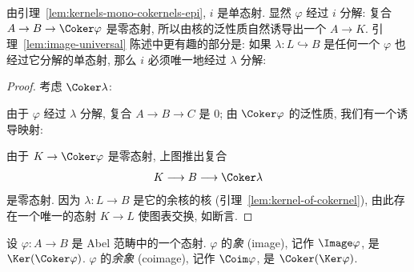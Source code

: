 \indent 由引理~\ref{lem:kernels-mono-cokernels-epi}, $i$ 是单态射. 显然 $\varphi$ 经过 $i$ 分解: 复合 $A\to B\to\Coker\varphi$ 是零态射, 所以由核的泛性质自然诱导出一个 $A\to K$. 引理~\ref{lem:image-universal} 陈述中更有趣的部分是: 如果 $\lambda:L\hookrightarrow B$ 是任何一个 $\varphi$ 也经过它分解的单态射, 那么 $i$ 必须唯一地经过 $\lambda$ 分解:
\begin{center}
\end{center}

\begin{proof}
考虑 $\Coker\lambda$:
\begin{center}
\end{center}
由于 $\varphi$ 经过 $\lambda$ 分解, 复合 $A\to B\to C$ 是 $0$; 由 $\Coker\varphi$ 的泛性质, 我们有一个诱导映射:
\begin{center}
\end{center}
由于 $K\to\Coker\varphi$ 是零态射, 上图推出复合
\[
K\longrightarrow B\longrightarrow\Coker\lambda
\]
是零态射. 因为 $\lambda:L\to B$ 是它的余核的核 (引理~\ref{lem:kernel-of-cokernel}), 由此存在一个唯一的态射 $K\to L$ 使图表交换, 如断言.
\end{proof}

\begin{definition}\label{def:image-coimage}
设 $\varphi:A\to B$ 是 Abel 范畴中的一个态射. $\varphi$ 的\emph{象} (image), 记作 $\Image\varphi$, 是 $\Ker(\Coker\varphi)$. $\varphi$ 的\emph{余象} (coimage), 记作 $\Coim\varphi$, 是 $\Coker(\Ker\varphi)$.
\end{definition}

